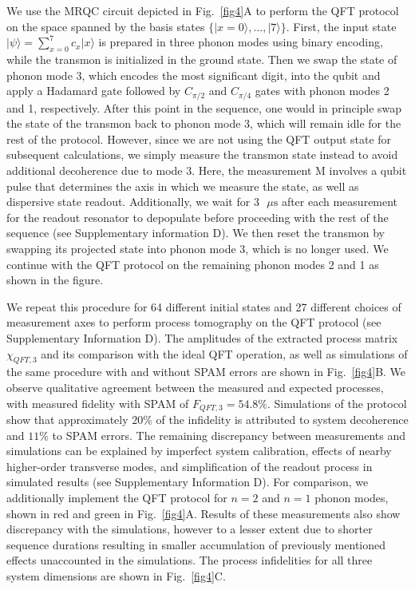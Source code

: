 \documentclass[12pt]{article}
\newcommand{\ket}[1]{\ensuremath{|{#1}\rangle}}
\begin{document}
We use the MRQC circuit depicted in Fig.~\ref{fig4}A to perform the QFT protocol on the space spanned by the basis states $\{\ket{x=0}, ...,\ket{7} \}$. First, the input state $\ket{\psi}=\sum_{x=0}^7c_x\ket{x}$ is prepared in three phonon modes using binary encoding, while the transmon is initialized in the ground state. Then we swap the state of phonon mode 3, which encodes the most significant digit, into the qubit and apply a Hadamard gate followed by $C_{\pi/2}$ and $C_{\pi/4}$ gates with phonon modes 2 and 1, respectively. After this point in the sequence, one would in principle swap the state of the transmon back to phonon mode 3, which will remain idle for the rest of the protocol. However, since we are not using the QFT output state for subsequent calculations, we simply measure the transmon state instead to avoid additional decoherence due to mode 3. Here, the measurement M involves a qubit pulse that determines the axis in which we measure the state, as well as dispersive state readout. Additionally, we wait for $3 \text{ $\mu$s}$ after each measurement for the readout resonator to depopulate before proceeding with the rest of the sequence (see Supplementary information D). We then reset the transmon by swapping its projected state into phonon mode 3, which is no longer used. We continue with the QFT protocol on the remaining phonon modes 2 and 1 as shown in the figure.

We repeat this procedure for 64 different initial states and 27 different choices of measurement axes to perform process tomography on the QFT protocol (see Supplementary Information D). The amplitudes of the extracted process matrix $\chi_{QFT, 3}$ and its comparison with the ideal QFT operation, as well as simulations of the same procedure with and without SPAM errors are shown in Fig.~\ref{fig4}B. We observe qualitative agreement between the measured and expected processes, with measured fidelity with SPAM of $F_{QFT,3} = 54.8\%$. Simulations of the protocol show that approximately $20\%$ of the infidelity is attributed to system decoherence and $11\%$ to SPAM errors. The remaining discrepancy between measurements and simulations can be explained by imperfect system calibration, effects of nearby higher-order transverse modes, and simplification of the readout process in simulated results (see Supplementary Information D). For comparison, we additionally implement the QFT protocol for $n=2$ and $n=1$ phonon modes, shown in red and green in Fig.~\ref{fig4}A. Results of these measurements also show discrepancy with the simulations, however to a lesser extent due to shorter sequence durations resulting in smaller accumulation of previously mentioned effects unaccounted in the simulations. The process infidelities for all three system dimensions are shown in Fig.~\ref{fig4}C.
\end{document}

